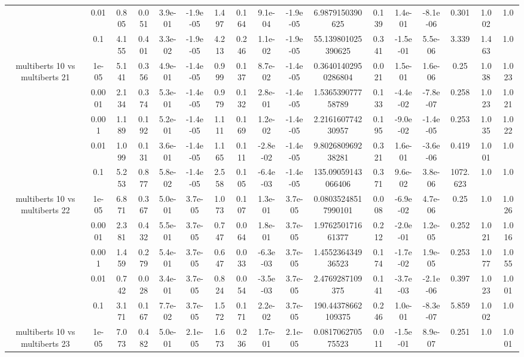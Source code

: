 \begin{tabular}{|c|c|c|c|c|c|c|c|c|c|c|c|c|c|c|c|c|}
 & 0.01 & 0.805 & 0.051 & 3.9e-01 & -1.9e-05 & 1.497 & 0.164 & 9.1e-04 & -1.9e-05 & 6.9879150390625 & 0.139 & 1.4e-01 & -8.1e-06 & 0.301 & 1.002 & 1.0 \\
 & 0.1 & 4.155 & 0.401 & 3.3e-02 & -1.9e-05 & 4.213 & 0.246 & 1.1e-02 & -1.9e-05 & 55.139801025390625 & 0.341 & -1.5e-01 & 5.5e-06 & 3.339 & 1.463 & 1.0 \\
\hline
\multirow{5}{*}{multiberts 10 vs multiberts 21} & 1e-05 & 5.141 & 0.356 & 4.9e-01 & -1.4e-05 & 0.999 & 0.137 & 8.7e-02 & -1.4e-05 & 0.36401402950286804 & 0.021 & 1.5e-01 & 1.6e-06 & 0.25 & 1.038 & 1.023 \\
 & 0.0001 & 2.134 & 0.374 & 5.3e-01 & -1.4e-05 & 0.979 & 0.132 & 2.8e-01 & -1.4e-05 & 1.536539077758789 & 0.133 & -4.4e-02 & -7.8e-07 & 0.258 & 1.023 & 1.021 \\
 & 0.001 & 1.189 & 0.192 & 5.2e-01 & -1.4e-05 & 1.111 & 0.169 & 1.2e-02 & -1.4e-05 & 2.216160774230957 & 0.195 & -9.0e-02 & -1.4e-05 & 0.253 & 1.035 & 1.022 \\
 & 0.01 & 1.099 & 0.131 & 3.6e-01 & -1.4e-05 & 1.165 & 0.111 & -2.8e-02 & -1.4e-05 & 9.802680969238281 & 0.321 & 1.6e-01 & -3.6e-06 & 0.419 & 1.001 & 1.0 \\
 & 0.1 & 5.253 & 0.877 & 5.8e-02 & -1.4e-05 & 2.558 & 0.105 & -6.4e-03 & -1.4e-05 & 135.09059143066406 & 0.371 & 9.6e-02 & 3.8e-06 & 1072.623 & 1.0 & 1.0 \\
\hline
\multirow{5}{*}{multiberts 10 vs multiberts 22} & 1e-05 & 6.871 & 0.367 & 5.0e-01 & 3.7e-05 & 1.073 & 0.107 & 1.3e-01 & 3.7e-05 & 0.08035248517990101 & 0.008 & -6.9e-02 & 4.7e-06 & 0.25 & 1.0 & 1.026 \\
 & 0.0001 & 2.381 & 0.432 & 5.5e-01 & 3.7e-05 & 0.747 & 0.064 & 1.8e-01 & 3.7e-05 & 1.976250171661377 & 0.212 & -2.0e-01 & 1.2e-05 & 0.252 & 1.021 & 1.016 \\
 & 0.001 & 1.459 & 0.279 & 5.4e-01 & 3.7e-05 & 0.647 & 0.033 & -6.3e-03 & 3.7e-05 & 1.455236434936523 & 0.174 & -1.7e-02 & 1.9e-05 & 0.253 & 1.077 & 1.055 \\
 & 0.01 & 0.742 & 0.028 & 3.4e-01 & 3.7e-05 & 0.824 & 0.054 & -3.5e-03 & 3.7e-05 & 2.4769287109375 & 0.141 & -3.7e-03 & -2.1e-06 & 0.397 & 1.023 & 1.001 \\
 & 0.1 & 3.171 & 0.167 & 7.7e-02 & 3.7e-05 & 1.572 & 0.171 & 2.2e-02 & 3.7e-05 & 190.44378662109375 & 0.246 & 1.0e-01 & -8.3e-07 & 5.859 & 1.002 & 1.0 \\
\hline
\multirow{5}{*}{multiberts 10 vs multiberts 23} & 1e-05 & 7.073 & 0.482 & 5.0e-01 & 2.1e-05 & 1.673 & 0.236 & 1.7e-01 & 2.1e-05 & 0.081706270575523 & 0.011 & -1.5e-01 & 8.9e-07 & 0.251 & 1.0 & 1.001 \\

\end{tabular}
